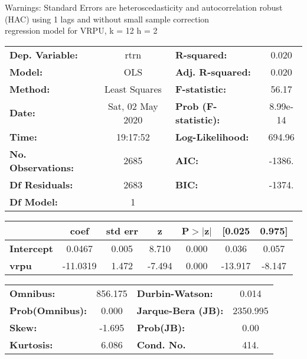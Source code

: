 Warnings: \newline
 [1] Standard Errors are heteroscedasticity and autocorrelation robust (HAC) using 1 lags and without small sample correction\\ 

regression model for VRPU, k = 12 h = 2\begin{center}
\begin{tabular}{lclc}
\toprule
\textbf{Dep. Variable:}    &       rtrn       & \textbf{  R-squared:         } &     0.020   \\
\textbf{Model:}            &       OLS        & \textbf{  Adj. R-squared:    } &     0.020   \\
\textbf{Method:}           &  Least Squares   & \textbf{  F-statistic:       } &     56.17   \\
\textbf{Date:}             & Sat, 02 May 2020 & \textbf{  Prob (F-statistic):} &  8.99e-14   \\
\textbf{Time:}             &     19:17:52     & \textbf{  Log-Likelihood:    } &    694.96   \\
\textbf{No. Observations:} &        2685      & \textbf{  AIC:               } &    -1386.   \\
\textbf{Df Residuals:}     &        2683      & \textbf{  BIC:               } &    -1374.   \\
\textbf{Df Model:}         &           1      & \textbf{                     } &             \\
\bottomrule
\end{tabular}
\begin{tabular}{lcccccc}
                   & \textbf{coef} & \textbf{std err} & \textbf{z} & \textbf{P$> |$z$|$} & \textbf{[0.025} & \textbf{0.975]}  \\
\midrule
\textbf{Intercept} &       0.0467  &        0.005     &     8.710  &         0.000        &        0.036    &        0.057     \\
\textbf{vrpu}      &     -11.0319  &        1.472     &    -7.494  &         0.000        &      -13.917    &       -8.147     \\
\bottomrule
\end{tabular}
\begin{tabular}{lclc}
\textbf{Omnibus:}       & 856.175 & \textbf{  Durbin-Watson:     } &    0.014  \\
\textbf{Prob(Omnibus):} &   0.000 & \textbf{  Jarque-Bera (JB):  } & 2350.995  \\
\textbf{Skew:}          &  -1.695 & \textbf{  Prob(JB):          } &     0.00  \\
\textbf{Kurtosis:}      &   6.086 & \textbf{  Cond. No.          } &     414.  \\
\bottomrule
\end{tabular}
\end{center}

